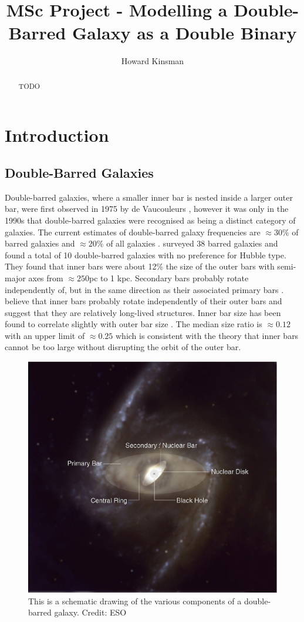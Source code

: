 \documentclass[a4paper,12pt]{article}
\author{Howard Kinsman}
\title{MSc Project - Modelling a Double-Barred Galaxy as a Double Binary}
\begin{document}
\maketitle
\begin{abstract}
TODO
\end{abstract}
\section{Introduction}
\subsection{Double-Barred Galaxies} 
Double-barred galaxies, where a smaller inner bar is nested inside a larger outer bar, were first observed in 1975 by de Vaucouleurs \citep{vaucouleurs}, however it was only in the 1990s that double-barred galaxies
were recognised as being a distinct category of galaxies. The current estimates of double-barred galaxy frequencies are $\approx30\%$ of barred galaxies and $\approx20\%$ of all galaxies \citep{erwin3}.
\cite{erwin2} surveyed 38 barred galaxies and found a total of 10 double-barred galaxies with no preference for Hubble type. They found that inner bars were about 12\% the size of the outer bars with
semi-major axes from $\approx250$pc to 1 kpc. Secondary bars probably rotate independently of, but in the same direction as their associated primary bars \cite{erwin2}.
\cite{erwin1} believe that inner bars probably rotate independently of their outer bars and suggest that they are relatively long-lived structures.
Inner bar size has been found to correlate slightly with outer bar size \citep{erwin3}. The median size ratio is $\approx0.12$ with an upper limit of $\approx0.25$ which is consistent with the theory that
inner bars cannot be too large without disrupting the orbit of the outer bar.

\begin{figure}[H]
\centering
\includegraphics[width=.9\textwidth]{./eso0128d.eps}
\caption{This is a schematic drawing of the various components of a double-barred galaxy. Credit: ESO}
\label{fig:doublepic}
\end{figure}
\end{document}
